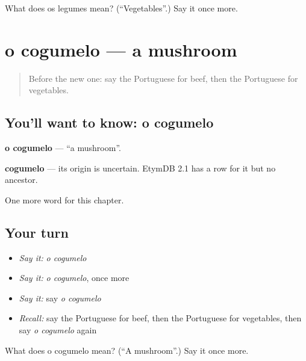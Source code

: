 \begin{tcolorbox}[breakable,colback=teal!4,colframe=teal!35!black,title={Before you move on}]
What does os legumes mean? (\textquotedblleft{}Vegetables\textquotedblright{}.) Say it once more.
\end{tcolorbox}
\section[o cogumelo]{o cogumelo — a mushroom}

\label{lesson:PT-C105-cogumelo}



\begin{quote}
Before the new one: say the Portuguese for beef, then the Portuguese for vegetables.
\end{quote}

\subsection*{You'll want to know: o cogumelo}
\textbf{o cogumelo} — \textquotedblleft{}a mushroom\textquotedblright{}.

\begin{cousinweb}
\textbf{cogumelo} — its origin is uncertain. EtymDB 2.1 has a row for it but no ancestor.
\end{cousinweb}

\begin{grammarlens}[title={What you've built}]
One more word for this chapter.
\end{grammarlens}

\subsection*{Your turn}
\begin{itemize}
\raggedright
  \item \emph{Say it:} \emph{o cogumelo}
  \item \emph{Say it:} \emph{o cogumelo}, once more
  \item \emph{Say it:} say \emph{o cogumelo}
  \item \emph{Recall:} say the Portuguese for beef, then the Portuguese for vegetables, then say \emph{o cogumelo} again
\end{itemize}

\begin{tcolorbox}[breakable,colback=teal!4,colframe=teal!35!black,title={Before you move on}]
What does o cogumelo mean? (\textquotedblleft{}A mushroom\textquotedblright{}.) Say it once more.
\end{tcolorbox}
